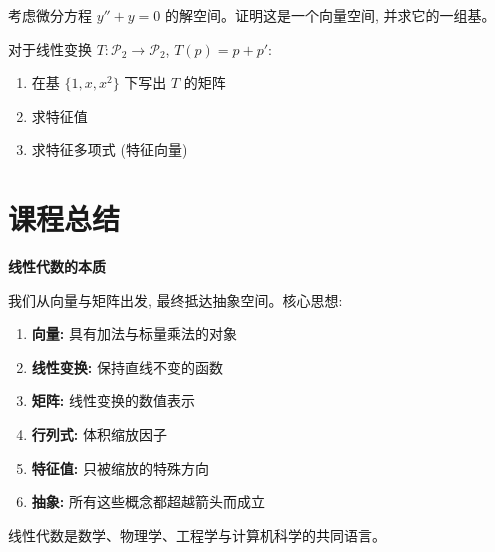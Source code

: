 \begin{exercise}[挑战]
考虑微分方程 $y'' + y = 0$ 的解空间。证明这是一个向量空间, 并求它的一组基。
\end{exercise}

\begin{problem}
对于线性变换 $T: \mathcal{P}_2 \to \mathcal{P}_2$, $T(p) = p + p'$:
\begin{enumerate}[label=(\alph*)]
    \item 在基 $\{1, x, x^2\}$ 下写出 $T$ 的矩阵
    \item 求特征值
    \item 求特征多项式 (特征向量)
\end{enumerate}
\end{problem}

\section{课程总结}

\begin{summary}
\textbf{线性代数的本质}

我们从向量与矩阵出发, 最终抵达抽象空间。核心思想:

\begin{enumerate}
    \item \textbf{向量:} 具有加法与标量乘法的对象
    \item \textbf{线性变换:} 保持直线不变的函数
    \item \textbf{矩阵:} 线性变换的数值表示
    \item \textbf{行列式:} 体积缩放因子
    \item \textbf{特征值:} 只被缩放的特殊方向
    \item \textbf{抽象:} 所有这些概念都超越箭头而成立
\end{enumerate}

线性代数是数学、物理学、工程学与计算机科学的共同语言。
\end{summary}

